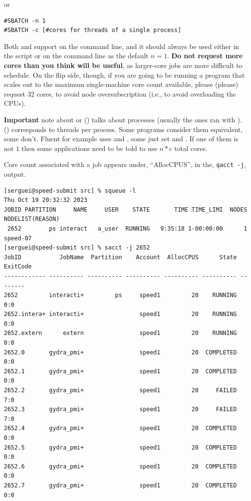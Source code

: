 or

\begin{verbatim}
#SBATCH -n 1
#SBATCH -c [#cores for threads of a single process]
\end{verbatim}

Both  and  support  on the command line,
and it should always be used either in the script or on the command line as the
default $n=1$.
\textbf{Do not request more cores than you think will be useful}, as larger-core
jobs are more difficult to schedule. On the flip side, though, if you 
are going to be running a program that scales out to the maximum single-machine
core count available, please (please) request 32 cores, to avoid node 
oversubscription (i.e., to avoid overloading the CPUs).

\textbf{Important} note about  or 
() talks about processes (usually the ones ran with ).
 () corresponds to threads per process.
Some programs consider them equivalent, some don't. Fluent for example
uses  and ,
some just set  and .
If one of them is not $1$ then some applications need to be told to
use $n*c$ total cores.


Core count associated with a job appears under,
``AllocCPUS'', in the, \texttt{qacct -j}, output.

\small
\begin{verbatim}
[serguei@speed-submit src] % squeue -l
Thu Oct 19 20:32:32 2023
JOBID PARTITION     NAME     USER    STATE       TIME TIME_LIMI  NODES NODELIST(REASON)
 2652        ps interact   a_user  RUNNING   9:35:18 1-00:00:00      1 speed-07
[serguei@speed-submit src] % sacct -j 2652
JobID           JobName  Partition    Account  AllocCPUS      State ExitCode
------------ ---------- ---------- ---------- ---------- ---------- --------
2652         interacti+         ps     speed1         20    RUNNING      0:0
2652.intera+ interacti+                speed1         20    RUNNING      0:0
2652.extern      extern                speed1         20    RUNNING      0:0
2652.0       gydra_pmi+                speed1         20  COMPLETED      0:0
2652.1       gydra_pmi+                speed1         20  COMPLETED      0:0
2652.2       gydra_pmi+                speed1         20     FAILED      7:0
2652.3       gydra_pmi+                speed1         20     FAILED      7:0
2652.4       gydra_pmi+                speed1         20  COMPLETED      0:0
2652.5       gydra_pmi+                speed1         20  COMPLETED      0:0
2652.6       gydra_pmi+                speed1         20  COMPLETED      0:0
2652.7       gydra_pmi+                speed1         20  COMPLETED      0:0
\end{verbatim}
\normalsize

